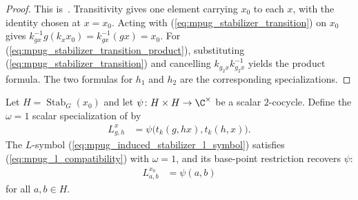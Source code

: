 \begin{proof}\leanok
    This is~\cite[``Stabilizer transition elements'']{QICLean2026Blueprint}.
    Transitivity gives one element carrying $x_0$ to each $x$, with the
    identity chosen at $x=x_0$. Acting with (\ref{eq:mpug_stabilizer_transition})
    on $x_0$ gives
    $k_{gx}^{-1}g(k_xx_0)=k_{gx}^{-1}(gx)=x_0$.
    For (\ref{eq:mpug_stabilizer_transition_product}), substituting
    (\ref{eq:mpug_stabilizer_transition}) and cancelling
    $k_{g_2x}k_{g_2x}^{-1}$ yields the product formula. The two formulas for
    $h_1$ and $h_2$ are the corresponding specializations.
\end{proof}

\begin{lemma}
    \label{thm:mpug_stabilizer_cocycle_l_symbol}
    \leanok
    Let $H=\operatorname{Stab}_G(x_0)$ and let
    $\psi\colon H\times H\to\C^\times$ be a scalar $2$-cocycle. Define the
    $\omega=1$ scalar specialization of \cite[Eq.~(20)]{GarreRubio2023MPOSym}
    by
    \begin{align}
        L^x_{g,h}
         & =\psi\bigl(t_k(g,hx),t_k(h,x)\bigr).
        \label{eq:mpug_induced_stabilizer_l_symbol}
    \end{align}
    The $L$-symbol (\ref{eq:mpug_induced_stabilizer_l_symbol}) satisfies
    (\ref{eq:mpug_l_compatibility}) with $\omega=1$, and its base-point
    restriction recovers $\psi$:
    \begin{align}
        L^{x_0}_{a,b} & =\psi(a,b)
        \label{eq:mpug_induced_stabilizer_base}
    \end{align}
    for all $a,b\in H$.


\end{lemma}
